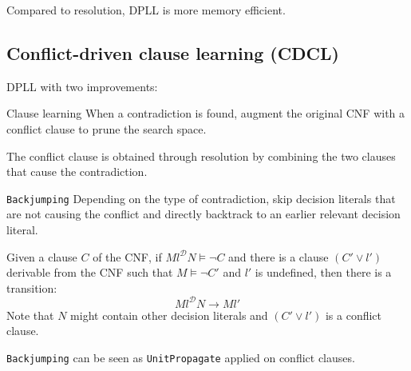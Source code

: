 \begin{remark}
    Compared to resolution, DPLL is more memory efficient.
\end{remark}



\subsection{Conflict-driven clause learning (CDCL)}

DPLL with two improvements:
\begin{descriptionlist}
    \item[Clause learning] 
        When a contradiction is found, augment the original CNF with a conflict clause
        to prune the search space.

        The conflict clause is obtained through resolution by combining the two clauses that cause the contradiction.

    \item[\texttt{Backjumping}]
        Depending on the type of contradiction, skip decision literals that are not causing the conflict
        and directly backtrack to an earlier relevant decision literal.

        Given a clause $C$ of the CNF, if $Ml^\mathcal{D}N \models \lnot C$ and 
        there is a clause $(C' \vee l')$ derivable from the CNF such that $M \models \lnot C'$ and
        $l'$ is undefined, then there is a transition:
        \[ Ml^\mathcal{D}N \rightarrow Ml' \] 
        Note that $N$ might contain other decision literals and $(C' \vee l')$ is a conflict clause.

        \begin{remark}
            \texttt{Backjumping} can be seen as \texttt{UnitPropagate} applied on conflict clauses.
        \end{remark}
\end{descriptionlist}

